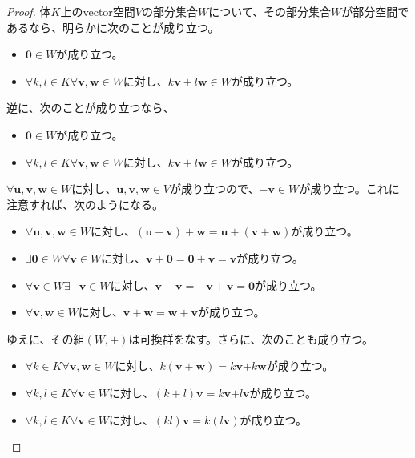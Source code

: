 \documentclass[dvipdfmx]{jsarticle}
\begin{document}
\begin{proof}
体$K$上のvector空間$V$の部分集合$W$について、その部分集合$W$が部分空間であるなら、明らかに次のことが成り立つ。
\begin{itemize}
\item
  $\mathbf{0} \in W$が成り立つ。
\item
  $\forall k,l \in K\forall\mathbf{v},\mathbf{w} \in W$に対し、$k\mathbf{v} + l\mathbf{w} \in W$が成り立つ。
\end{itemize}\par
逆に、次のことが成り立つなら、
\begin{itemize}
\item
  $\mathbf{0} \in W$が成り立つ。
\item
  $\forall k,l \in K\forall\mathbf{v},\mathbf{w} \in W$に対し、$k\mathbf{v} + l\mathbf{w} \in W$が成り立つ。
\end{itemize}
$\forall\mathbf{u},\mathbf{v},\mathbf{w} \in W$に対し、$\mathbf{u},\mathbf{v},\mathbf{w} \in V$が成り立つので、$- \mathbf{v} \in W$が成り立つ。これに注意すれば、次のようになる。
\begin{itemize}
\item
  $\forall\mathbf{u},\mathbf{v},\mathbf{w} \in W$に対し、$\left( \mathbf{u} + \mathbf{v} \right) + \mathbf{w} = \mathbf{u} + \left( \mathbf{v} + \mathbf{w} \right)$が成り立つ。
\item
  $\exists\mathbf{0} \in W\forall\mathbf{v} \in W$に対し、$\mathbf{v} + \mathbf{0} = \mathbf{0} + \mathbf{v} = \mathbf{v}$が成り立つ。
\item
  $\forall\mathbf{v} \in W\exists - \mathbf{v} \in W$に対し、$\mathbf{v} - \mathbf{v} = - \mathbf{v} + \mathbf{v} = \mathbf{0}$が成り立つ。
\item
  $\forall\mathbf{v},\mathbf{w} \in W$に対し、$\mathbf{v} + \mathbf{w} = \mathbf{w} + \mathbf{v}$が成り立つ。
\end{itemize}
ゆえに、その組$(W, + )$は可換群をなす。さらに、次のことも成り立つ。
\begin{itemize}
\item
  $\forall k \in K\forall\mathbf{v},\mathbf{w} \in W$に対し、$k\left( \mathbf{v} + \mathbf{w} \right) = k\mathbf{v}\mathbf{+}k\mathbf{w}$が成り立つ。
\item
  $\forall k,l \in K\forall\mathbf{v} \in W$に対し、$(k + l)\mathbf{v} = k\mathbf{v}\mathbf{+}l\mathbf{v}$が成り立つ。
\item
  $\forall k,l \in K\forall\mathbf{v} \in W$に対し、$(kl)\mathbf{v} = k\left( l\mathbf{v} \right)$が成り立つ。

\end{itemize}
\end{proof}
\end{document}
